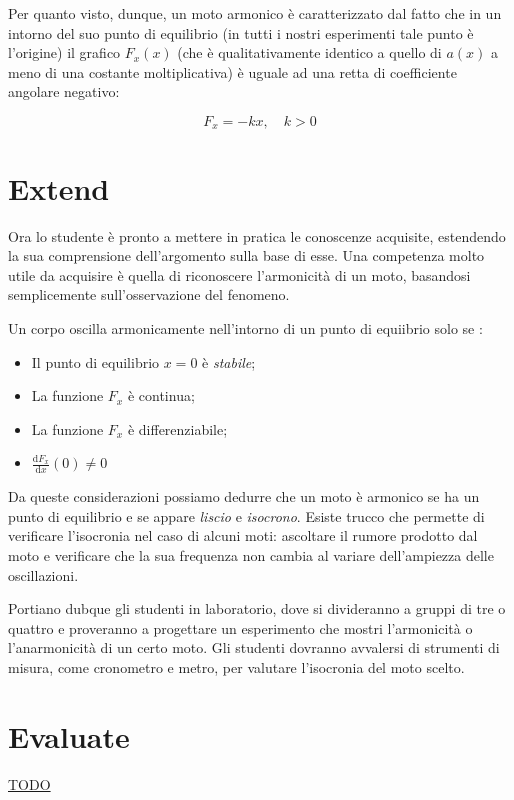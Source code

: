 \documentclass{article}
\begin{document}
Per quanto visto, dunque, un moto armonico è caratterizzato dal fatto che in un intorno del suo punto di
equilibrio (in tutti i nostri esperimenti tale punto è l'origine) il grafico $F_x(x)$ (che è qualitativamente identico a
quello di $a(x)$ a meno di una costante moltiplicativa) è uguale ad una retta di coefficiente angolare negativo:

\begin{equation}
F_{x}=-kx, \quad k>0
\end{equation}

\section{Extend}
Ora lo studente è pronto a mettere in pratica le conoscenze
acquisite, estendendo la sua comprensione dell'argomento
sulla base di esse. Una competenza molto utile da acquisire
è quella di riconoscere l'armonicità di un moto, basandosi
semplicemente sull'osservazione del fenomeno.

Un corpo oscilla armonicamente nell'intorno di un punto
di equiibrio solo se \cite{giliberti2014detecting}:

\begin{itemize}
\item Il punto di equilibrio $x=0$ è \emph{stabile};
\item La funzione $F_{x}$ è continua;
\item La funzione $F_{x}$ è differenziabile;
\item $\frac{\mathrm{d}F_{x}}{\mathrm{d}x}(0) \neq 0$
\end{itemize}

Da queste considerazioni possiamo dedurre che un moto
è armonico se ha un punto di equilibrio e se appare
\emph{liscio} e \emph{isocrono}.
Esiste trucco che permette di verificare l'isocronia
nel caso di alcuni moti: ascoltare il rumore prodotto
dal moto e verificare che la sua frequenza non cambia al
variare dell'ampiezza delle oscillazioni.

Portiano dubque gli studenti in laboratorio, dove si divideranno
a gruppi di tre o quattro e proveranno a progettare un esperimento
che mostri l'armonicità o l'anarmonicità di un certo moto.
Gli studenti dovranno avvalersi di strumenti di misura,
come cronometro e metro, per valutare l'isocronia del
moto scelto.

\section{Evaluate}
\underline{TODO}

{}

\end{document}
